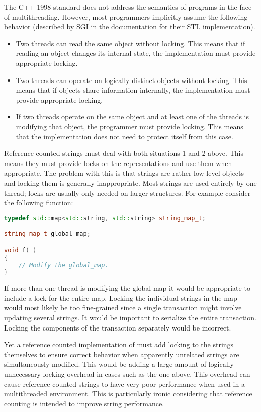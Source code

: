 The C++ 1998 standard does not address the semantics of programs in the face of
multithreading. However, most programmers implicitly assume the following
behavior (described by SGI in the documentation for their STL implementation).

\begin{itemize}
\item Two threads can read the same object without locking. This means that if
reading an object changes its internal state, the implementation must provide
appropriate locking.
\item Two threads can operate on logically distinct objects without locking.
This means that if objects share information internally, the implementation
must provide appropriate locking.
\item If two threads operate on the same object and at least one of the
threads is modifying that object, the programmer must provide locking. This
means that the implementation does not need to protect itself from this case.
\end{itemize}


Reference counted strings must deal with both situations 1 and 2 above. This
means they must provide locks on the representations and use them when
appropriate. The problem with this is that strings are rather low level
objects and locking them is generally inappropriate. Most strings are used
entirely by one thread; locks are usually only needed on larger structures.
For example consider the following function:

\begin{lstlisting}[language=C++]
typedef std::map<std::string, std::string> string_map_t;

string_map_t global_map;

void f( )
{
    // Modify the global_map.
}
\end{lstlisting}

If more than one thread is modifying the global map it would be appropriate to
include a lock for the entire map. Locking the individual strings in the map
would most likely be too fine-grained since a single transaction might involve
updating several strings. It would be important to serialize the entire
transaction. Locking the components of the transaction separately would be
incorrect.

Yet a reference counted implementation of  must add locking
to the strings themselves to ensure correct behavior when apparently unrelated
strings are simultaneously modified. This would be adding a large amount of
logically unnecessary locking overhead in cases such as the one above. This
overhead can cause reference counted strings to have very poor performance
when used in a multithreaded environment.  This is
particularly ironic considering that reference counting is intended to improve
string performance.

